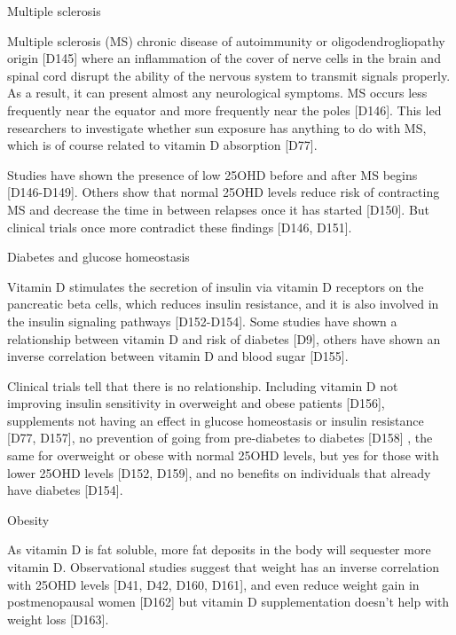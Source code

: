  

Multiple sclerosis 

 

Multiple sclerosis (MS) chronic disease of autoimmunity or oligodendrogliopathy origin [D145] where an inflammation of the cover of nerve cells in the brain and spinal cord disrupt the ability of the nervous system to transmit signals properly. As a result, it can present almost any neurological symptoms. MS occurs less frequently near the equator and more frequently near the poles [D146]. This led researchers to investigate whether sun exposure has anything to do with MS, which is of course related to vitamin D absorption [D77]. 

 

Studies have shown the presence of low 25OHD before and after MS begins [D146-D149]. Others show that normal 25OHD levels reduce risk of contracting MS and decrease the time in between relapses once it has started [D150]. But clinical trials once more contradict these findings [D146, D151]. 

 

Diabetes and glucose homeostasis 

 

 Vitamin D stimulates the secretion of insulin via vitamin D receptors on the pancreatic beta cells, which reduces insulin resistance, and it is also involved in the insulin signaling pathways [D152-D154]. Some studies have shown a relationship between vitamin D and risk of diabetes [D9], others have shown an inverse correlation between vitamin D and blood sugar [D155]. 

 

Clinical trials tell that there is no relationship. Including vitamin D not improving insulin sensitivity in overweight and obese patients [D156], supplements not having an effect in glucose homeostasis or insulin resistance [D77, D157], no prevention of going from pre-diabetes to diabetes [D158] , the same for overweight or obese with normal 25OHD levels, but yes for those with lower 25OHD levels [D152, D159], and no benefits on individuals that already have diabetes [D154]. 

 

Obesity 

 

As vitamin D is fat soluble, more fat deposits in the body will sequester more vitamin D. Observational studies suggest that weight has an inverse correlation with 25OHD levels [D41, D42, D160, D161], and even reduce weight gain in postmenopausal women [D162] but vitamin D supplementation doesn't help with weight loss [D163]. 



